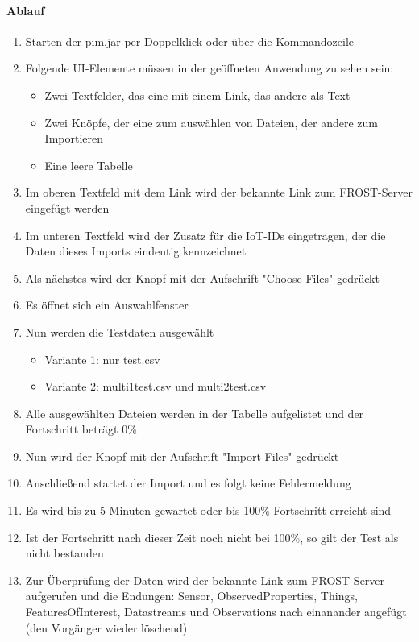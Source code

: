 \paragraph{Ablauf}
\begin{enumerate}
\item Starten der pim.jar per Doppelklick oder über die Kommandozeile
\item Folgende UI-Elemente m\"ussen in der ge\"offneten Anwendung zu sehen sein:
\begin{itemize}
\item Zwei Textfelder, das eine mit einem Link, das andere als Text
\item Zwei Kn\"opfe, der eine zum ausw\"ahlen von Dateien, der andere zum Importieren
\item Eine leere Tabelle
\end{itemize}
\item Im oberen Textfeld mit dem Link wird der bekannte Link zum FROST-Server eingefügt werden
\item Im unteren Textfeld wird der Zusatz f\"ur die IoT-IDs eingetragen, der die Daten dieses Imports eindeutig kennzeichnet
\item Als n\"achstes wird der Knopf mit der Aufschrift "Choose Files" gedrückt
\item Es \"offnet sich ein Auswahlfenster
\item Nun werden die Testdaten ausgew\"ahlt
\begin{itemize}
\item Variante 1: nur test.csv
\item Variante 2: multi1test.csv und multi2test.csv
\end{itemize}
\item Alle ausgew\"ahlten Dateien werden in der Tabelle aufgelistet und der Fortschritt betr\"agt 0\%
\item Nun wird der Knopf mit der Aufschrift "Import Files" gedr\"uckt
\item Anschlie\ss end startet der Import und es folgt keine Fehlermeldung
\item Es wird bis zu 5 Minuten gewartet oder bis 100\% Fortschritt erreicht sind
\item Ist der Fortschritt nach dieser Zeit noch nicht bei 100\%, so gilt der Test als nicht bestanden
\item Zur \"Uberpr\"ufung der Daten wird der bekannte Link zum FROST-Server aufgerufen und die Endungen: Sensor, ObservedProperties, Things, FeaturesOfInterest, Datastreams und Observations nach einanander angefügt (den Vorgänger wieder löschend)

\end{enumerate}
